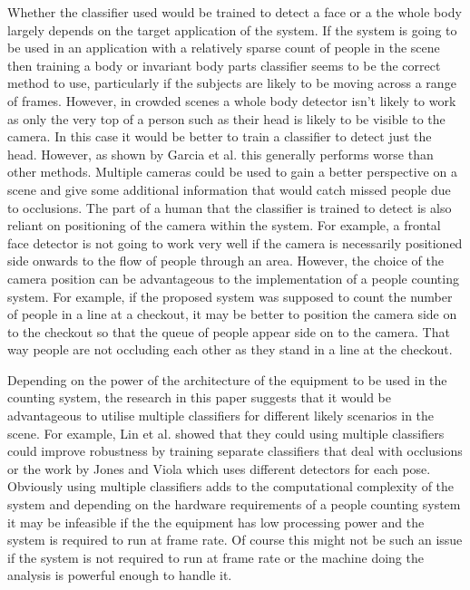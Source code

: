 \documentclass[conference]{IEEEtran}
\begin{document}
Whether the classifier used would be trained to detect a face or a the whole body largely depends on the target application of the system. If the system is going to be used in an application with a relatively sparse count of people in the scene then training a body or invariant body parts classifier seems to be the correct method to use, particularly if the subjects are likely to be moving across a range of frames. However, in crowded scenes a whole body detector isn't likely to work as only the very top of a person such as their head is likely to be visible to the camera. In this case it would be better to train a classifier to detect just the head. However, as shown by Garcia et al. \cite{garcia2008effective} this generally performs worse than other methods. Multiple cameras could be used to gain a better perspective on a scene and give some additional information that would catch missed people due to occlusions. The part of a human that the classifier is trained to detect is also reliant on positioning of the camera within the system. For example, a frontal face detector is not going to work very well if the camera is necessarily positioned side onwards to the flow of people through an area. However, the choice of the camera position can be advantageous to the implementation of a people counting system. For example, if the proposed system was supposed to count the number of people in a line at a checkout, it may be better to position the camera side on to the checkout so that the queue of people appear side on to the camera. That way people are not occluding each other as they stand in a line at the checkout.

Depending on the power of the architecture of the equipment to be used in the counting system, the research in this paper suggests that it would be advantageous to utilise multiple classifiers for different likely scenarios in the scene. For example, Lin et al. \cite{lin2004fast} showed that they could using multiple classifiers could improve robustness by training separate classifiers that deal with occlusions or the work by Jones and Viola \cite{jones2003fast} which uses different detectors for each pose. Obviously using multiple classifiers adds to the computational complexity of the system and depending on the hardware requirements of a people counting system it may be infeasible if the the equipment has low processing power and the system is required to run at frame rate. Of course this might not be such an issue if the system is not required to run at frame rate or the machine doing the analysis is powerful enough to handle it.
\end{document}
